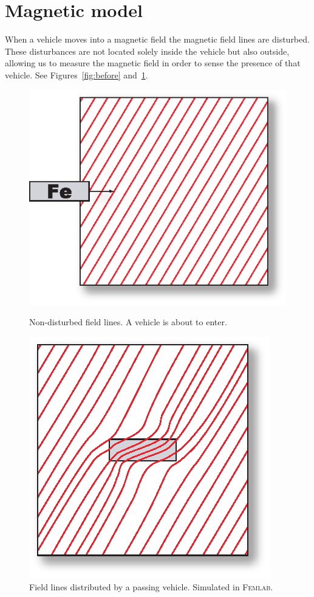 \section{Magnetic model}

When a vehicle moves into a magnetic field the magnetic field lines are disturbed. These disturbances are not located solely inside the vehicle but also outside, allowing us to measure the magnetic field in order to sense the presence of that vehicle. See Figures~\ref{fig:before} and~\ref{fig:after}.
\begin{subfigures}
\begin{figure}[!th]
 \centering
 \begin{minipage}{0.45\linewidth}
 \centering
 	\includegraphics[height=5 cm]{images/before}
  	\caption[Non-disturbed field lines]{Non-disturbed field lines. A vehicle is about to enter.}
  	\label{fig:before} 
 \end{minipage} \hfill
 \begin{minipage}{0.45\linewidth}
 \centering
  	\includegraphics[height=5 cm]{images/after}
  	\caption[Field lines distributed by a vehicle]{Field lines distributed by a passing vehicle. Simulated in \textsc{Femlab}\footnotemark.}
  	\label{fig:after}
 \end{minipage}
  \end{figure}
 \end{subfigures}

%  

